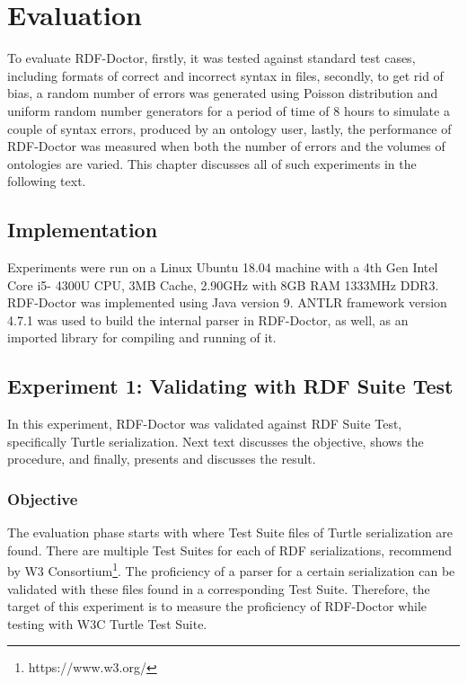 \chapter{Evaluation}
\label{ch:evaluation}
To evaluate RDF-Doctor, firstly, it was tested against standard test cases, including formats of correct and incorrect syntax in files, secondly, to get rid of bias, a random number of errors was generated using Poisson distribution and uniform random number generators for a period of time of 8 hours to simulate a couple of syntax errors, produced by an ontology user, lastly, the performance of RDF-Doctor was measured when both the number of errors and the volumes of ontologies are varied. This chapter discusses all of such experiments in the following text. 
\section{Implementation}
Experiments were run on a Linux
Ubuntu 18.04 machine with a 4th Gen Intel Core i5-
4300U CPU, 3MB Cache, 2.90GHz with 8GB RAM
1333MHz DDR3. RDF-Doctor was implemented using
Java version 9. ANTLR framework version 4.7.1 was used to build the internal parser in RDF-Doctor, as well, as an imported library for compiling and running of it.  

\section{Experiment 1: Validating with RDF Suite Test} In this experiment, RDF-Doctor was validated against RDF Suite Test, specifically Turtle serialization. Next text discusses the objective, shows the procedure, and finally, presents and discusses the result.     
\subsection{Objective}
The evaluation phase starts with \cite{TurtleTests:Online} where Test Suite files of Turtle serialization are found. There are multiple Test Suites for each of RDF serializations, recommend by W3 Consortium\footnote{https://www.w3.org/}. The proficiency of a parser for a certain serialization can be validated with these files found in a corresponding Test Suite. Therefore, the target of this experiment is to measure the proficiency of RDF-Doctor while testing with W3C Turtle Test Suite.

